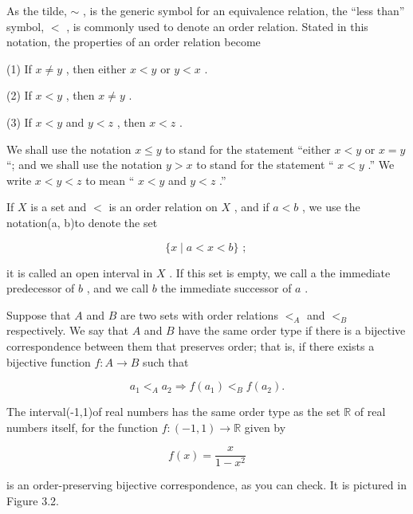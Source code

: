 As the tilde, \(\sim\) , is the generic symbol for an equivalence relation, the ``less than'' symbol, \(<\) , is commonly used to denote an order relation. Stated in this notation, the properties of an order relation become

(1) If \(x \neq  y\) , then either \(x < y\) or \(y < x\) .

(2) If \(x < y\) , then \(x \neq  y\) .

(3) If \(x < y\) and \(y < z\) , then \(x < z\) .

We shall use the notation \(x \leq  y\) to stand for the statement ``either \(x < y\) or \(x = y\) ``; and we shall use the notation \(y > x\) to stand for the statement `` \(x < y\) .'' We write \(x < y < z\) to mean `` \(x < y\) and \(y < z\) .''

\begin{definition} If \(X\) is a set and \(<\) is an order relation on \(X\) , and if \(a < b\) , we use the notation(a, b)to denote the set

\[
\{ x \mid  a < x < b\} \text{ ; }
\]

it is called an open interval in \(X\) . If this set is empty, we call a the immediate predecessor of \(b\) , and we call \(b\) the immediate successor of \(a\) .
\end{definition}


\begin{definition} Suppose that \(A\) and \(B\) are two sets with order relations \({ < }_{A}\) and \({ < }_{B}\) respectively. We say that \(A\) and \(B\) have the same order type if there is a bijective correspondence between them that preserves order; that is, if there exists a bijective function \(f : A \rightarrow  B\) such that

\[
{a}_{1}{ < }_{A}{a}_{2} \Rightarrow  f\left( {a}_{1}\right) { < }_{B}f\left( {a}_{2}\right) .
\]
\end{definition}


\begin{centeredblock}
\begin{example} The interval(-1,1)of real numbers has the same order type as the set \(\mathbb{R}\) of real numbers itself, for the function \(f : \left( {-1,1}\right)  \rightarrow  \mathbb{R}\) given by

\[
f\left( x\right)  = \frac{x}{1 - {x}^{2}}
\]

is an order-preserving bijective correspondence, as you can check. It is pictured in Figure 3.2.
\end{example}
\end{centeredblock}

